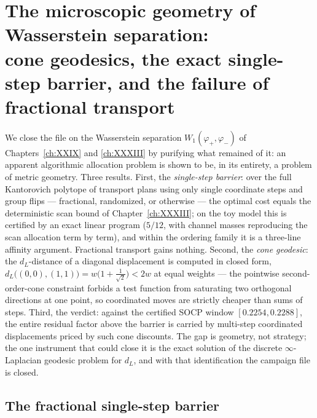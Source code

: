 \chapter[The microscopic geometry of Wasserstein separation]{The microscopic geometry of Wasserstein separation:\\ cone geodesics, the exact single-step barrier, and the failure of fractional transport}\label{ch:XXXVII}
\begin{summary}
We close the file on the Wasserstein separation $W_1(\varphi_+,\varphi_-)$ of Chapters~\ref{ch:XXIX} and \ref{ch:XXXIII} by purifying what remained of it: an apparent algorithmic allocation problem
is shown to be, in its entirety, a problem of metric geometry. Three results. First, the
\emph{single-step barrier}: over the full Kantorovich polytope of transport plans using
only single coordinate steps and group flips --- fractional, randomized, or otherwise ---
the optimal cost equals the deterministic scan bound of Chapter~\ref{ch:XXXIII}; on the toy model
this is certified by an exact linear program ($5/12$, with channel masses reproducing the
scan allocation term by term), and within the ordering family it is a three-line affinity
argument. Fractional transport gains nothing. Second, the \emph{cone geodesic}: the
$d_L$-distance of a diagonal displacement is computed in closed form,
$d_L\bigl((0,0),(1,1)\bigr)=w\bigl(1+\tfrac1{\sqrt2}\bigr)<2w$ at equal weights --- the
pointwise second-order-cone constraint forbids a test function from saturating two
orthogonal directions at one point, so coordinated moves are strictly cheaper than sums
of steps. Third, the verdict: against the certified SOCP window $[0.2254,0.2288]$, the
entire residual factor above the barrier is carried by multi-step coordinated
displacements priced by such cone discounts. The gap is geometry, not strategy; the one
instrument that could close it is the exact solution of the discrete
$\infty$-Laplacian geodesic problem for $d_L$, and with that identification the campaign
file is closed.
\end{summary}


\section{The fractional single-step barrier}\label{XXXVII:sec:barrier}

